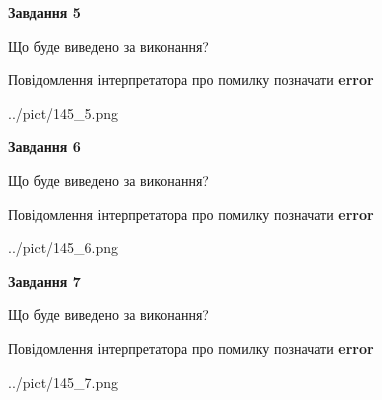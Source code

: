 \documentclass[10pt, ukrainian]{article}
\begin{document}
{\begin {large}
{\begin {center}\textbf{Завдання 5}\end {center}}\par
Що буде виведено за виконання? \par
Повідомлення інтерпретатора про помилку позначати \textbf{error}

\begin{center}
	{../pict/145_5.png}
\end{center}
\newpage

{\begin {center}\textbf{Завдання 6}\end {center}}\par
Що буде виведено за виконання? \par
Повідомлення інтерпретатора про помилку позначати \textbf{error}

\begin{center}
	{../pict/145_6.png}
\end{center}
\newpage

{\begin {center}\textbf{Завдання 7}\end {center}}\par
Що буде виведено за виконання? \par
Повідомлення інтерпретатора про помилку позначати \textbf{error}

\begin{center}
	{../pict/145_7.png}
\end{center}
\newpage

\end {large}}
\end{document}
